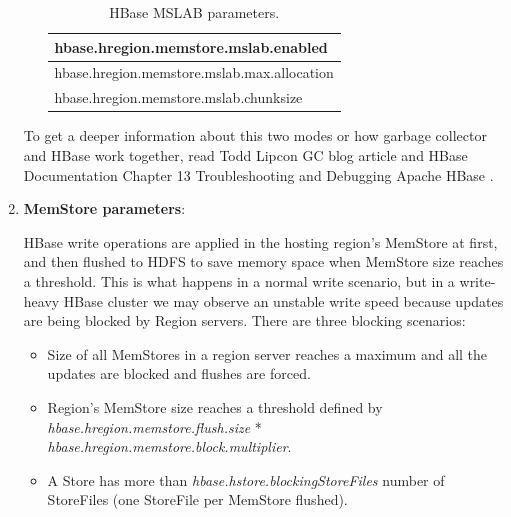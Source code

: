 \begin{enumerate}
\begin{enumerate}
\par
\begin{table}[htbp]
\begin{center}
\begin{tabular}{|l|}
\hline
hbase.hregion.memstore.mslab.enabled  \\ \hline
hbase.hregion.memstore.mslab.max.allocation \\ \hline
hbase.hregion.memstore.mslab.chunksize \\ \hline
\end{tabular}
\label{HBase MSLAB parameters.}
\caption{HBase MSLAB parameters.}
\end{center}
\end{table}

\end{enumerate}


To get a deeper information about this two modes or how garbage collector and HBase work together, read Todd Lipcon GC blog article \cite{MSLABexplained} and HBase Documentation Chapter 13 Troubleshooting and Debugging Apache HBase \cite{ApacheHBaseLogs}.

\item \textbf{MemStore parameters}:
\par
HBase write operations are applied in the hosting region's MemStore at first, and then flushed to HDFS to save memory space when MemStore size reaches a threshold. This is what happens in a normal write scenario, but in a write-heavy HBase cluster we may observe an unstable write speed because updates are being blocked by Region servers. There are three blocking scenarios:
\begin{itemize}
\item Size of all MemStores in a region server reaches a maximum and all the updates are blocked and flushes are forced.
\item Region's MemStore size reaches a threshold defined by
\textit{hbase.hregion.memstore.flush.size} * \textit{hbase.hregion.memstore.block.multiplier}.
\item A Store has more than \textit{hbase.hstore.blockingStoreFiles} number of StoreFiles (one StoreFile per MemStore flushed).
\end{itemize}


\end{enumerate}
